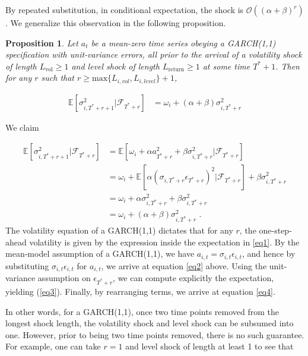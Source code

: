 \documentclass[11pt,3p,review,authoryear]{elsarticle}
\newtheorem{prop}{Proposition}
\theoremstyle{definition}
\newenvironment{proof-of-proposition}[1][{}]{\noindent{\bf
    Proof of Proposition {#1}}
  \hspace*{.5em}}{\qed\bigskip\\}
\begin{document}
By repeated substitution, in conditional expectation, the shock is $\mathcal{O}((\alpha+\beta)^{r})$.  We generalize this observation in the following proposition.

\begin{prop}
Let $a_{t}$ be a mean-zero time series obeying a GARCH(1,1) specification with unit-variance errors, all prior to the arrival of a volatility shock of length $L_{\text{vol}} \geq 1$ and level shock of length $L_{\text{return}}\geq 1$ at some time $T^{*}+1$.  Then for any $r$ such that $r \geq \text{max}\{L_{i, vol},L_{i, level}\} + 1$, 

\begin{align*}
\mathbb{E}[ \sigma^{2}_{i,T^{*}+r+1} |\mathcal{F}_{T^{*}+r}] & = \omega_{i} + (\alpha + \beta)\sigma^{2}_{i,T^{*}+r}
\end{align*}
\end{prop}

\begin{proof-of-proposition}
We claim

\begin{align}
\mathbb{E}[ \sigma^{2}_{i,T^{*}+r+1} |\mathcal{F}_{T^{*}+r}] & = \mathbb{E}[\omega_{i} + \alpha a_{T^{*}+r}^{2} + \beta\sigma^{2}_{i,T^{*}+r} |\mathcal{F}_{T^{*}+r}] \label{eq1}\\
& = \omega_{i} + \mathbb{E}[\alpha(\sigma_{i,T^{*}+r}\epsilon_{T^{*}+r})^{2} |\mathcal{F}_{T^{*}+r}] + \beta\sigma^{2}_{i,T^{*}+r} \label{eq2}\\
& = \omega_{i} + \alpha\sigma_{i,T^{*}+r}^{2} + \beta\sigma^{2}_{i,T^{*}+r} \label{eq3}\\
& = \omega_{i} + (\alpha + \beta) \sigma^{2}_{i,T^{*}+r}\label{eq4} \text{ .}
\end{align}
The volatility equation of a GARCH(1,1) dictates that for any $r$, the one-step-ahead volatility is given by the expression inside the expectation in \eqref{eq1}.  By the mean-model assumption of a GARCH(1,1), we have $a_{i,t} = \sigma_{i,t}\epsilon_{i,t}$, and hence by substituting $\sigma_{i,t}\epsilon_{i,t}$ for $a_{i,t}$, we arrive at equation \eqref{eq2} above.  Using the unit-variance assumption on $\epsilon_{T^{*}+r}$, we can compute explicitly the expectation, yielding (\ref{eq3}).  Finally, by rearranging terms, we arrive at equation \eqref{eq4}.
\end{proof-of-proposition}
In other words, for a GARCH(1,1), once two time points removed from the longest shock length, the volatility shock and level shock can be subsumed into one.  However, prior to being two time points removed, there is no such guarantee.  For example, one can take $r = 1$ and level shock of length at least 1 to see that 
\end{document}
